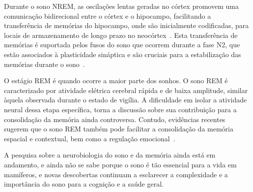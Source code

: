 Durante o sono NREM, as oscilações lentas geradas no córtex promovem uma comunicação bidirecional entre o córtex e o hipocampo,
facilitando a transferência de memórias do hipocampo, onde são inicialmente codificadas, para locais de armazenamento de longo
prazo no neocórtex~\cite{diekelmannMemory2010}. Esta transferência de memórias é suportada pelos fusos do sono que ocorrem durante
a fase N2, que estão associados à plasticidade sináptica e são cruciais para a estabilização das memórias durante o
sono~\cite{raschReactivation2008, peyracheMechanism2020}.

O estágio REM é quando ocorre a maior parte dos sonhos. O sono REM é caracterizado por atividade elétrica cerebral rápida e de
baixa amplitude, similar àquela observada durante o estado de vigília. A dificuldade em isolar a atividade neural dessa etapa
específica, torna a discussão sobre sua contribuição para a consolidação da memória ainda controversa. Contudo, evidências
recentes sugerem que o sono REM também pode facilitar a consolidação da memória espacial e contextual, bem como a regulação
emocional~\cite{payneSleep2012, boyceREM2017}.

A pesquisa sobre a neurobiologia do sono e da memória ainda está em andamento, e ainda não se sabe porque o sono é tão essencial
para a vida em mamíferos, e novas descobertas continuam a esclarecer a complexidade e a importância do sono para a cognição e a
saúde geral.
